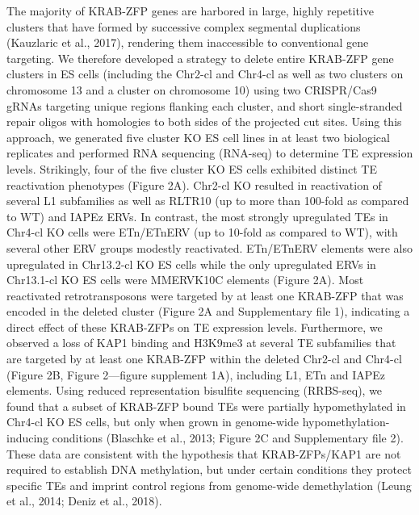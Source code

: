 \documentclass[11pt,a4paper]{article}
\begin{document}
The majority of KRAB-ZFP genes are harbored in large, highly repetitive clusters that have formed by successive complex segmental duplications (Kauzlaric et al., 2017), rendering them inaccessible to conventional gene targeting. We therefore developed a strategy to delete entire KRAB-ZFP gene clusters in ES cells (including the Chr2-cl and Chr4-cl as well as two clusters on chromosome 13 and a cluster on chromosome 10) using two CRISPR/Cas9 gRNAs targeting unique regions flanking each cluster, and short single-stranded repair oligos with homologies to both sides of the projected cut sites. Using this approach, we generated five cluster KO ES cell lines in at least two biological replicates and performed RNA sequencing (RNA-seq) to determine TE expression levels. Strikingly, four of the five cluster KO ES cells exhibited distinct TE reactivation phenotypes (Figure 2A). Chr2-cl KO resulted in reactivation of several L1 subfamilies as well as RLTR10 (up to more than 100-fold as compared to WT) and IAPEz ERVs. In contrast, the most strongly upregulated TEs in Chr4-cl KO cells were ETn/ETnERV (up to 10-fold as compared to WT), with several other ERV groups modestly reactivated. ETn/ETnERV elements were also upregulated in Chr13.2-cl KO ES cells while the only upregulated ERVs in Chr13.1-cl KO ES cells were MMERVK10C elements (Figure 2A). Most reactivated retrotransposons were targeted by at least one KRAB-ZFP that was encoded in the deleted cluster (Figure 2A and Supplementary file 1), indicating a direct effect of these KRAB-ZFPs on TE expression levels. Furthermore, we observed a loss of KAP1 binding and H3K9me3 at several TE subfamilies that are targeted by at least one KRAB-ZFP within the deleted Chr2-cl and Chr4-cl (Figure 2B, Figure 2—figure supplement 1A), including L1, ETn and IAPEz elements. Using reduced representation bisulfite sequencing (RRBS-seq), we found that a subset of KRAB-ZFP bound TEs were partially hypomethylated in Chr4-cl KO ES cells, but only when grown in genome-wide hypomethylation-inducing conditions (Blaschke et al., 2013; Figure 2C and Supplementary file 2). These data are consistent with the hypothesis that KRAB-ZFPs/KAP1 are not required to establish DNA methylation, but under certain conditions they protect specific TEs and imprint control regions from genome-wide demethylation (Leung et al., 2014; Deniz et al., 2018).
\end{document}
